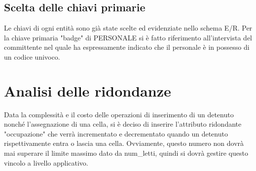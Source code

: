 \documentclass[a4paper,12pt]{report}
\begin{document}
\subsection{Scelta delle chiavi primarie}
Le chiavi di ogni entità sono già state scelte ed evidenziate nello schema E/R.
%
Per la chiave primaria "badge" di PERSONALE si è fatto riferimento all'intervista del committente nel quale ha espressamente indicato che il personale è in possesso di un codice univoco.
\section{Analisi delle ridondanze}
Data la complessità e il costo delle operazioni di inserimento di un detenuto nonché l'assegnazione di una cella, si è deciso di inserire l'attributo ridondante "occupazione" che verrà incrementato e decrementato quando un detenuto rispettivamente entra o lascia una cella.
%
Ovviamente, questo numero non dovrà mai superare il limite massimo dato da num\_letti, quindi si dovrà gestire questo vincolo a livello applicativo.
\end{document}
